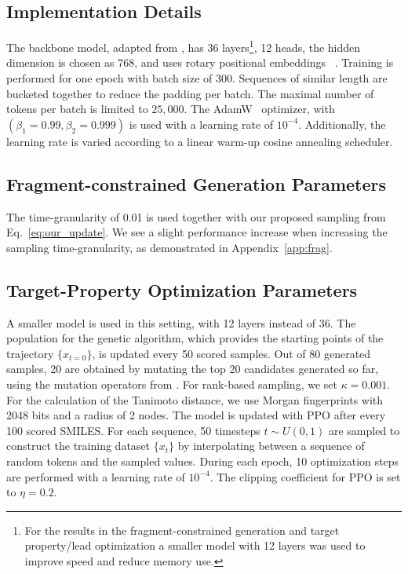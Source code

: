 \documentclass{article} %
\begin{document}
\subsection{Implementation Details}\label{app:hparams}
The backbone model, adapted from \cite{Peebles2022DiT}, has 36 layers\footnote{For the results in the fragment-constrained generation and target property/lead optimization a smaller model with 12 layers was used to improve speed and reduce memory use.}, 12 heads, the hidden dimension is chosen as 768, and uses rotary positional embeddings ~\citep{su2023roformerenhancedtransformerrotary}. Training is performed for one epoch with batch size of 300. Sequences of similar length are bucketed together to reduce the padding per batch. The maximal number of tokens per batch is limited to $25,000$. The AdamW~\citep{adamw} optimizer, with $(\beta_1=0.99,\beta_2=0.999)$ is used with a learning rate of $10^{-4}$. Additionally, the learning rate is varied according to a linear warm-up cosine annealing scheduler.

\subsection{Fragment-constrained Generation Parameters}\label{app:frag_sampling}
The time-granularity of 0.01 is used together with our proposed sampling from Eq.~\ref{eq:our_update}. We see a slight performance increase when increasing the sampling time-granularity, as demonstrated in Appendix~\ref{app:frag}.
\subsection{Target-Property Optimization Parameters}\label{sec:optimization_params}

A smaller model is used in this setting, with 12 layers instead of 36.
The population for the genetic algorithm, which provides the starting points of the trajectory $\{x_{t=0}\}$,
is updated every 50 scored samples.
Out of 80 generated samples, 20 are obtained by mutating the top 20 candidates generated so far,
using the mutation operators from \cite{graphga}.
For rank-based sampling, we set $\kappa=0.001$. For the calculation of the Tanimoto distance, we use Morgan fingerprints with 2048 bits and a radius of 2 nodes.
The model is updated with PPO after every 100 scored SMILES.
For each sequence, 50 timesteps $t \sim U(0,1)$ are sampled to construct the training dataset $\{x_t\}$
by interpolating between a sequence of random tokens and the sampled values.
During each epoch, 10 optimization steps are performed with a learning rate of $10^{-4}$.
The clipping coefficient for PPO is set to $\eta=0.2$.
\end{document}
